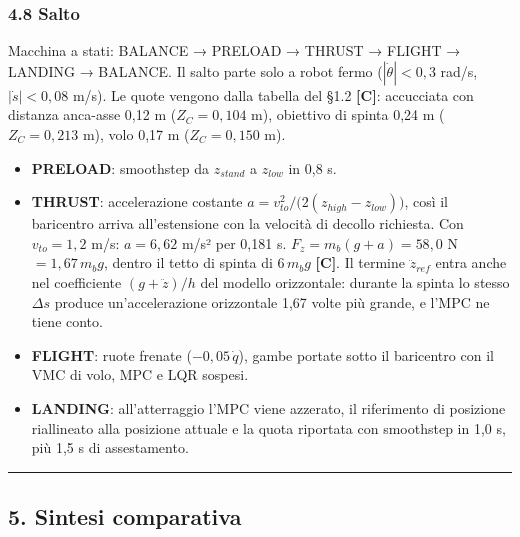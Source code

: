 \documentclass[
]{article}
\providecommand{\tightlist}{%
  \setlength{\itemsep}{0pt}\setlength{\parskip}{0pt}}
\begin{document}
\subsubsection{4.8 Salto}\label{48-salto}

Macchina a stati: BALANCE → PRELOAD → THRUST → FLIGHT → LANDING → BALANCE. Il salto parte solo a robot fermo (\(|\dot\theta| < 0{,}3\) rad/s, \(|\dot s| < 0{,}08\) m/s). Le quote vengono dalla tabella del §1.2 \textbf{[C]}: accucciata con distanza anca-asse 0,12 m (\(Z_C = 0{,}104\) m), obiettivo di spinta 0,24 m (\(Z_C = 0{,}213\) m), volo 0,17 m (\(Z_C = 0{,}150\) m).

\begin{itemize}
\tightlist
\item \textbf{PRELOAD}: smoothstep da \(z_{stand}\) a \(z_{low}\) in 0,8 s.
\item \textbf{THRUST}: accelerazione costante \(a = v_{to}^2/\big(2(z_{high}-z_{low})\big)\), così il baricentro arriva all'estensione con la velocità di decollo richiesta. Con \(v_{to} = 1{,}2\) m/s: \(a = 6{,}62\) m/s² per 0,181 s. \(F_z = m_b(g+a) = 58{,}0\) N \(= 1{,}67\,m_bg\), dentro il tetto di spinta di \(6\,m_bg\) \textbf{[C]}. Il termine \(\ddot z_{ref}\) entra anche nel coefficiente \((g+\ddot z)/h\) del modello orizzontale: durante la spinta lo stesso \(\Delta s\) produce un'accelerazione orizzontale 1,67 volte più grande, e l'MPC ne tiene conto.
\item \textbf{FLIGHT}: ruote frenate (\(-0{,}05\,\dot q\)), gambe portate sotto il baricentro con il VMC di volo, MPC e LQR sospesi.
\item \textbf{LANDING}: all'atterraggio l'MPC viene azzerato, il riferimento di posizione riallineato alla posizione attuale e la quota riportata con smoothstep in 1,0 s, più 1,5 s di assestamento.
\end{itemize}

\begin{center}\rule{0.5\linewidth}{0.5pt}\end{center}

\subsection{5. Sintesi comparativa}\label{5-sintesi-comparativa}
\end{document}
